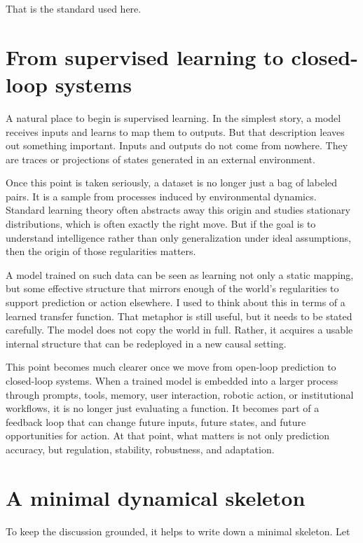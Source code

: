 \documentclass[11pt]{article}
\begin{document}
That is the standard used here.

\section{From supervised learning to closed-loop systems}


A natural place to begin is supervised learning. In the simplest story, a model receives inputs and learns to map them to outputs. But that description leaves out something important. Inputs and outputs do not come from nowhere. They are traces or projections of states generated in an external environment.

Once this point is taken seriously, a dataset is no longer just a bag of labeled pairs. It is a sample from processes induced by environmental dynamics. Standard learning theory often abstracts away this origin and studies stationary distributions, which is often exactly the right move. But if the goal is to understand intelligence rather than only generalization under ideal assumptions, then the origin of those regularities matters.

A model trained on such data can be seen as learning not only a static mapping, but some effective structure that mirrors enough of the world's regularities to support prediction or action elsewhere. I used to think about this in terms of a learned transfer function. That metaphor is still useful, but it needs to be stated carefully. The model does not copy the world in full. Rather, it acquires a usable internal structure that can be redeployed in a new causal setting.

This point becomes much clearer once we move from open-loop prediction to closed-loop systems. When a trained model is embedded into a larger process through prompts, tools, memory, user interaction, robotic action, or institutional workflows, it is no longer just evaluating a function. It becomes part of a feedback loop that can change future inputs, future states, and future opportunities for action. At that point, what matters is not only prediction accuracy, but regulation, stability, robustness, and adaptation.

\section{A minimal dynamical skeleton}


To keep the discussion grounded, it helps to write down a minimal skeleton. Let
\end{document}
